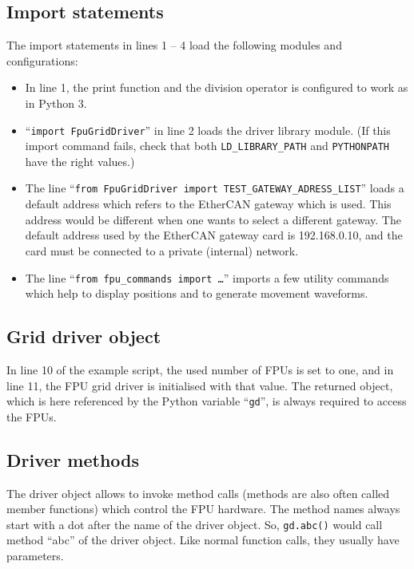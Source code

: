 \documentclass[11pt,a4paper]{scrartcl}
\begin{document}
\subsection{Import statements}

The import statements in lines 1 -- 4 load the following modules and
configurations:

\begin{itemize}
\item In line 1, the print function and the division operator is
  configured to work as in Python 3.
  
\item ``\texttt{import FpuGridDriver}'' in line 2 loads the driver
  library module. (If this import command fails, check that both
  \verb+LD_LIBRARY_PATH+ and \verb+PYTHONPATH+ have the right values.)

\item The line ``\texttt{from FpuGridDriver import
  TEST\_GATEWAY\_ADRESS\_LIST}'' loads a default address which refers to
  the EtherCAN gateway which is used. This address would be different
  when one wants to select a different gateway. The default
  address used by the EtherCAN gateway card is 192.168.0.10,
  and the card must be connected to a private (internal) network.

\item The line ``\texttt{from fpu\_commands import \ldots}'' imports a
  few utility commands which help to display positions and to generate
  movement waveforms.

 
\end{itemize}

\subsection{Grid driver object}

In line 10 of the example script, the used number of FPUs is set to
one, and in line 11, the FPU grid driver is initialised with that
value. The returned object, which is here referenced by the Python variable
``\texttt{gd}'', is always required to access the FPUs.

\subsection{Driver methods}
The driver object allows to invoke method calls (methods are also
often called member functions) which control the FPU hardware. The
method names always start with a dot after the name of the driver
object.  So, \texttt{gd.abc()} would call method ``abc'' of the driver
object. Like normal function calls, they usually have parameters.
\end{document}
